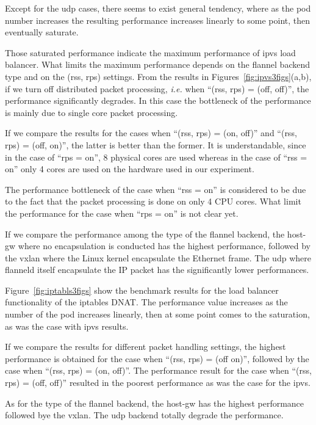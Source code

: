 Except for the udp cases, there seems to exist general tendency, 
where as the pod number increases the resulting performance increases linearly to some point, 
then eventually saturate.

Those saturated performance indicate the maximum performance of ipvs load balancer.
What limits the maximum performance depends on the flannel backend type and on the (rss, rps) settings.
From the results in Figures~\ref{fig:ipvs3figs}(a,b), if we turn off distributed packet processing,
{\it i.e.} when \enquote{(rss, rps) = (off, off)}, the performance significantly degrades. 
In this case the bottleneck of the performance is mainly due to single core packet processing.

If we compare the results for the cases when \enquote{(rss, rps) = (on, off)} and \enquote{(rss, rps) = (off, on)},
the latter is better than the former.
It is understandable, since in the case of \enquote{rps = on}, 8 physical cores are used whereas 
in the case of \enquote{rss = on} only 4 cores are used on the hardware used in our experiment.

The performance bottleneck of the case when \enquote{rss = on} is considered 
to be due to the fact that the packet processing is done on only 4 CPU cores.
What limit the performance for the case when \enquote{rps = on} is not clear yet.

If we compare the performance among the type of the flannel backend, 
the host-gw where no encapsulation is conducted has the highest performance,
followed by the vxlan where the Linux kernel encapsulate the Ethernet frame.
The udp where flanneld itself encapsulate the IP packet has the significantly lower performances.

Figure~\ref{fig:iptabls3figs} show the benchmark results for the load balancer 
functionality of the iptables DNAT. 
The performance value increases as the number of the pod increases linearly, 
then at some point comes to the saturation, as was the case with ipvs results.

If we compare the results for different packet handling settings, the highest performance is 
obtained for the case when \enquote{(rss, rps) = (off on)}, followed by the case when \enquote{(rss, rps) = (on, off)}. 
The performance result for the case when \enquote{(rss, rps) = (off, off)} resulted in the 
poorest performance as was the case for the ipvs.

As for the type of the flannel backend, the host-gw has the highest performance followed 
bye the vxlan. The udp backend totally degrade the performance.

